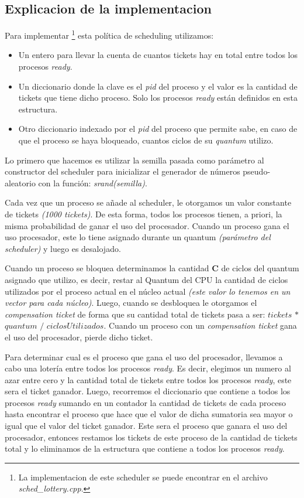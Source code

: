 \subsection{Explicacion de la implementacion}
Para implementar \footnote{La implementacion de este scheduler se puede encontrar en el archivo \textit{sched\_lottery.cpp}.} esta política de scheduling utilizamos:
\begin{itemize}
	\item Un entero para llevar la cuenta de cuantos tickets hay en total entre todos los procesos \textit{ready}.
	\item Un diccionario donde la clave es el \textit{pid} del proceso y el valor es la cantidad de tickets que tiene dicho proceso. Solo los procesos \textit{ready} están definidos en esta estructura.
	\item Otro diccionario indexado por el \textit{pid} del proceso que permite sabe, en caso de que el proceso se haya bloqueado, cuantos ciclos de su \textit{quantum} utilizo.
\end{itemize}


Lo primero que hacemos es utilizar la semilla pasada como parámetro al constructor del scheduler para inicializar el generador de números pseudo-aleatorio con la función: \textit{srand(semilla)}.

Cada vez que un proceso se añade al scheduler, le otorgamos un valor constante de tickets \textit{(1000 tickets)}.
De esta forma, todos los procesos tienen, a priori, la misma probabilidad de ganar el uso del procesador.
Cuando un proceso gana el uso procesador, este lo tiene asignado durante un quantum \textit{(parámetro del scheduler)} y luego es desalojado.

Cuando un proceso se bloquea determinamos la cantidad \textbf{C} de ciclos del quantum asignado que utilizo, es decir, restar al Quantum del CPU la cantidad de ciclos utilizados por el proceso actual en el núcleo actual \textit{(este valor lo tenemos en un vector para cada núcleo)}.
Luego, cuando se desbloquea le otorgamos el \textit{compensation ticket} de forma que su cantidad total de tickets pasa a ser: $tickets$ $*$ $quantum$ $/$ $ciclosUtilizados$.
Cuando un proceso con un \textit{compensation ticket} gana el uso del procesador, pierde dicho ticket.

Para determinar cual es el proceso que gana el uso del procesador, llevamos a cabo una lotería entre todos los procesos \textit{ready}. Es decir, elegimos un numero al azar entre cero y la cantidad total de tickets entre todos los procesos \textit{ready}, este sera el ticket ganador. Luego, recorremos el diccionario que contiene a todos los procesos \textit{ready} sumando en un contador la cantidad de tickets de cada proceso hasta encontrar el proceso que hace que el valor de dicha sumatoria sea mayor o igual que el valor del ticket ganador. Este sera el proceso que ganara el uso del procesador, entonces restamos los tickets de este proceso de la cantidad de tickets total y lo eliminamos de la estructura que contiene a todos los procesos \textit{ready}.